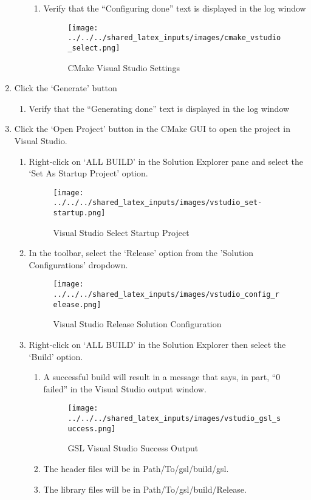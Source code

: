\begin{enumerate}
\begin{enumerate}
		\begin{enumerate}
			\item Verify that the “Configuring done” text is displayed in the log window
			\begin{figure}[H]
				\centering
				\texttt{[image: ../../../shared\_latex\_inputs/images/cmake\_vstudio\_select.png]}
				\caption{CMake Visual Studio Settings}
			\end{figure}
		\end{enumerate}
	\end{enumerate}	
	\item Click the ‘Generate’ button
	\begin{enumerate}
		\item Verify that the “Generating done” text is displayed in the log window
	\end{enumerate}	
	\item Click the ‘Open Project’ button in the CMake GUI to open the project in Visual Studio.
	\begin{enumerate}
		\item Right-click on ‘ALL BUILD’ in the Solution Explorer pane and select the ‘Set As Startup Project’ option. 
			\begin{figure}[H]
				\centering
				\texttt{[image: ../../../shared\_latex\_inputs/images/vstudio\_set-startup.png]}
				\caption{Visual Studio Select Startup Project}
			\end{figure}
		\item In the toolbar, select the ‘Release’ option from the 'Solution Configurations' dropdown.
			\begin{figure}[H]
				\centering
				\texttt{[image: ../../../shared\_latex\_inputs/images/vstudio\_config\_release.png]}
				\caption{Visual Studio Release Solution Configuration}
			\end{figure}
		\item Right-click on ‘ALL BUILD’ in the Solution Explorer then select the ‘Build’ option.
		\begin{enumerate}
			\item A successful build will result in a message that says, in part, “0 failed” in the Visual Studio output window. 
			\begin{figure}[H]
				\centering
				\texttt{[image: ../../../shared\_latex\_inputs/images/vstudio\_gsl\_success.png]}
				\caption{GSL Visual Studio Success Output}
			\end{figure}
			\item The header files will be in Path/To/gsl/build/gsl.
			\item The library files will be in Path/To/gsl/build/Release.
		\end{enumerate}
	\end{enumerate}		
\end{enumerate}